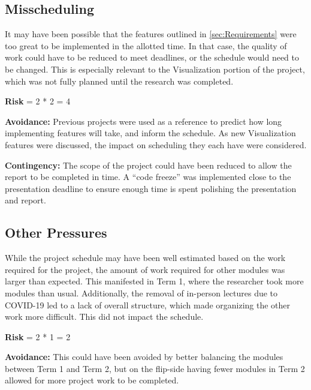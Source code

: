 \subsection{Misscheduling}
It may have been possible that the features outlined in \cref{sec:Requirements} were too great to be implemented in the allotted time.
In that case, the quality of work could have to be reduced to meet deadlines, or the schedule would need to be changed.
This is especially relevant to the Visualization portion of the project, which was not fully planned until the research was completed.

\textbf{Risk} = 2 * 2 = 4

\textbf{Avoidance:}
Previous projects were used as a reference to predict how long implementing features will take, and inform the schedule.
As new Visualization features were discussed, the impact on scheduling they each have were considered.

\textbf{Contingency:}
The scope of the project could have been reduced to allow the report to be completed in time.
A ``code freeze'' was implemented close to the presentation deadline to ensure enough time is spent polishing the presentation and report.

\subsection{Other Pressures}
While the project schedule may have been well estimated based on the work required for the project, the amount of work required for other modules was larger than expected.
This manifested in Term 1, where the researcher took more modules than usual. 
Additionally, the removal of in-person lectures due to COVID-19 led to a lack of overall structure, which made organizing the other work more difficult.
This did not impact the schedule.

\textbf{Risk} = 2 * 1 = 2

\textbf{Avoidance:}
This could have been avoided by better balancing the modules between Term 1 and Term 2, but on the flip-side having fewer modules in Term 2 allowed for more project work to be completed.

